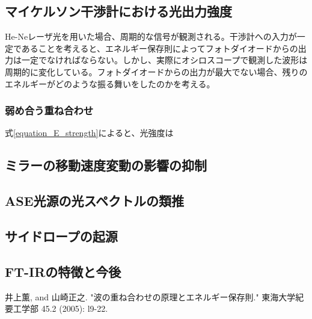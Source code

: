 \documentclass[uplatex, titlepage, fontsize=10pt, paper=a4paper]{jsarticle}
\numberwithin{equation}{section}
\begin{document}
\subsection{マイケルソン干渉計における光出力強度}
He-Neレーザ光を用いた場合、周期的な信号が観測される。干渉計への入力が一定であることを考えると、エネルギー保存則によってフォトダイオードからの出力は一定でなければならない。しかし、実際にオシロスコープで観測した波形は周期的に変化している。フォトダイオードからの出力が最大でない場合、残りのエネルギーがどのような振る舞いをしたのかを考える。

\subsubsection{弱め合う重ね合わせ}
式\ref{equation_E_strength}によると、光強度は

\subsection{ミラーの移動速度変動の影響の抑制}

\subsection{ASE光源の光スペクトルの類推}

\subsection{サイドロープの起源}

\subsection{FT-IRの特徴と今後}

\begin{thebibliography}{99}
    井上薫, and 山崎正之. "波の重ね合わせの原理とエネルギー保存則." 東海大学紀要工学部 45.2 (2005): l9-22.
\end{thebibliography}
\end{document}
